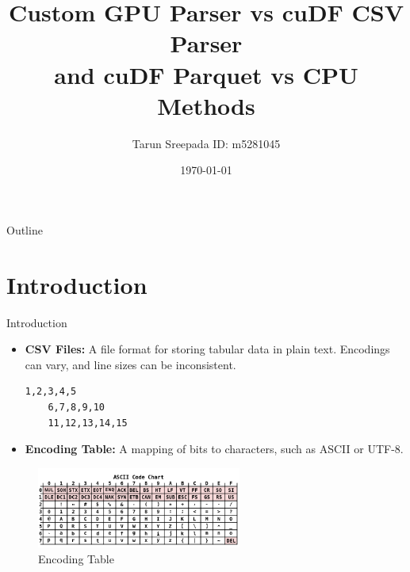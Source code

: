 \documentclass{beamer}
\title[Custom GPU Parser vs cuDF CSV Parser]{Custom GPU Parser vs cuDF CSV Parser \\ and cuDF Parquet vs CPU Methods}
\author{Tarun Sreepada ID: m5281045}
\institute{University of Aizu}
\date{\today}
\begin{document}
\begin{frame}
  \titlepage
\end{frame}

\begin{frame}{Outline}
  \tableofcontents
\end{frame}

\section{Introduction}
\begin{frame}[fragile]{Introduction}
  \begin{itemize}
    \item \textbf{CSV Files:} A file format for storing tabular data in plain text. Encodings can vary, and line sizes can be inconsistent.
    \begin{lstlisting}[caption={CSV file}]
    1,2,3,4,5
    6,7,8,9,10
    11,12,13,14,15
    \end{lstlisting}
    \item \textbf{Encoding Table:} A mapping of bits to characters, such as ASCII or UTF-8.
  \end{itemize}

  \begin{figure}
    \includegraphics[width=0.6\textwidth]{image copy.png}
    \caption{Encoding Table}
  \end{figure}
\end{frame}
\end{document}
